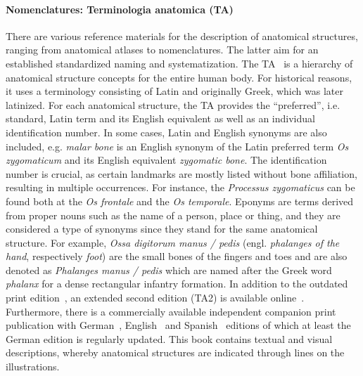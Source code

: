 \documentclass[sw]{iosart2x}
\newcommand{\latin}[1]{\emph{#1}}
\begin{document}
\paragraph{Nomenclatures: Terminologia anatomica (TA)}\label{sec:ta}
There are various reference materials for the description of anatomical structures, ranging from anatomical atlases to nomenclatures.
The latter aim for an established standardized naming and systematization.
The TA~\citep{ta2} is a hierarchy of anatomical structure concepts for the entire human body.
For historical reasons, it uses a terminology consisting of Latin and originally Greek, which was later latinized.
For each anatomical structure, the TA provides the \enquote{preferred}, i.e. standard, Latin term and its English equivalent as well as an individual identification number.
In some cases, Latin and English synonyms are also included, e.g. \emph{malar bone} is an English synonym of the Latin preferred term \latin{Os zygomaticum} and its English equivalent \emph{zygomatic bone}.
The identification number is crucial, as certain landmarks are mostly listed without bone affiliation, resulting in multiple occurrences. %
For instance, the \latin{Processus zygomaticus} can be found both at the \latin{Os frontale} and the \latin{Os temporale}.
Eponyms are terms derived from proper nouns such as the name of a person, place or thing, and they are considered a type of synonyms since they stand for the same anatomical structure.
For example, \latin{Ossa digitorum manus / pedis} (engl. \emph{phalanges of the hand}, respectively \emph{foot}) are the small bones of the fingers and toes and are also denoted as \latin{Phalanges manus / pedis} which are named after the Greek word \emph{phalanx} for a dense rectangular infantry formation.
In addition to the outdated print edition~\citep{ta1998}, an extended second edition (TA2) is available online~\citep{ta2}.
Furthermore, there is a commercially available independent companion print publication with German~\citep{anatomylexicon}, English~\citep{pocketatlas} and Spanish~\citep{taspanish} editions of which at least the German edition is regularly updated.
This book contains textual and visual descriptions, whereby anatomical structures are indicated through lines on the illustrations.
\end{document}
